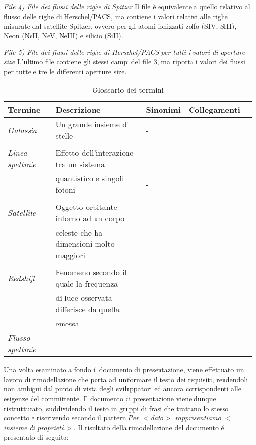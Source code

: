 \documentclass[12pt,a4paper,onecolumn]{article}
\begin{document}
\begin{flushleft}
		\textit{File 4) File dei flussi delle righe di Spitzer}\newline
		Il file è equivalente a quello relativo al flusso delle righe di Herschel/PACS, ma contiene i valori relativi alle righe misurate dal satellite Spitzer, ovvero per gli atomi ionizzati zolfo (SIV, SIII), Neon (NeII, NeV, NeIII) e silicio (SiII).\newline
		
		\textit{File 5) File dei flussi delle righe di Herschel/PACS per tutti i valori di aperture size}
		L’ultimo file contiene gli stessi campi del file 3, ma riporta i valori dei flussi per tutte e tre le differenti aperture size.\newline
	\end{flushleft}

	\begin{table}[h]
		\centering
		\caption{Glossario dei termini}
		\begin{tabular}{lllll}
			\hline
			\rowcolor[HTML]{66CC99}Termine & Descrizione & Sinonimi & Collegamenti				  \\ \hline
			
			\textit{Galassia}			&	Un grande insieme di stelle					&	-	 &\\
										&												&		 &\\
			\textit{Linea spettrale}	&	Effetto dell'interazione tra un sistema		&  		 &\\
										&   quantistico e singoli fotoni				&	- 	 &\\
										&  					                     		&        &\\
			\textit{Satellite}			& 	Oggetto orbitante intorno ad un corpo		&		 &\\
										& 	celeste che ha dimensioni molto maggiori	&		 &\\
										&												&		 &\\
			\textit{Redshift} 			& 	Fenomeno secondo il quale la frequenza 		&		 &\\
										& 	di luce osservata differisce da quella		&		 &\\
										& 	emessa 										&		 &\\
			\textit{Flusso spettrale}	&												&		 &\\	
		\end{tabular}
	\end{table}

	\begin{flushleft}
		Una volta esaminato a fondo il documento di presentazione, viene effettuato un lavoro di rimodellazione che porta ad uniformare il testo dei requisiti, rendendoli non ambigui dal punto di vista degli sviluppatori ed ancora corrispondenti alle esigenze del committente. Il documento di presentazione viene dunque ristrutturato, suddividendo il testo in gruppi di frasi che trattano lo stesso concetto e riscrivendo secondo il pattern \textit{Per $<$dato$>$ rappresentiamo $<$insieme di proprietà$>$}.\newline
		Il risultato della rimodellazione del documento \'{e} presentato di seguito:
	\end{flushleft}
	
\end{document}
